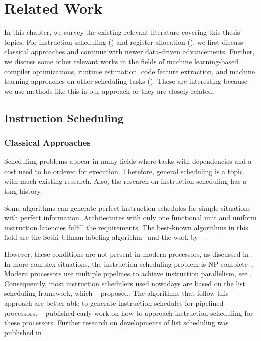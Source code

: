 \chapter{Related Work}
\label{sec:rw}
In this chapter, we survey the existing relevant literature covering this thesis' topics. 
For instruction scheduling () and register allocation (), we first discuss classical approaches and continue with newer data-driven advancements.
Further, we discuss some other relevant works in the fields of machine learning-based compiler optimizations, runtime estimation, code feature extraction, and machine learning approaches on other scheduling tasks ().
These are interesting because we use methods like this in our approach or they are closely related.

\section{Instruction Scheduling}
\label{sec:rw:instruction-scheduling}
\subsection{Classical Approaches}
Scheduling problems appear in many fields where tasks with dependencies and a cost need to be ordered for execution.
Therefore, general scheduling is a topic with much existing research.
Also, the research on instruction scheduling has a long history.

Some algorithms can generate perfect instruction schedules for simple situations with perfect information.
Architectures with only one functional unit and uniform instruction latencies fulfill the requirements.
The best-known algorithms in this field are the Sethi-Ullman labeling algorithm~\cite{sethi1970generation} and the work by \citeauthor{proebsting1991linear}~\cite{proebsting1991linear}.

However, these conditions are not present in modern processors, as discussed in .
In more complex situations, the instruction scheduling problem is NP-complete~\cite{hennessy1983postpass}.
Modern processors use multiple pipelines to achieve instruction parallelism, see .
Consequently, most instruction schedulers used nowadays are based on the list scheduling framework, which \citeauthor{landskov1980local}~\cite{landskov1980local} proposed.
The algorithms that follow this approach are better able to generate instruction schedules for pipelined processors.
\citeauthor{heller1961sequencing}~\cite{heller1961sequencing} published early work on how to approach instruction scheduling for these processors.
Further research on developments of list scheduling was published in~\cite{bernstein1991global,gibbons1986efficient,hennessy1983postpass}.

